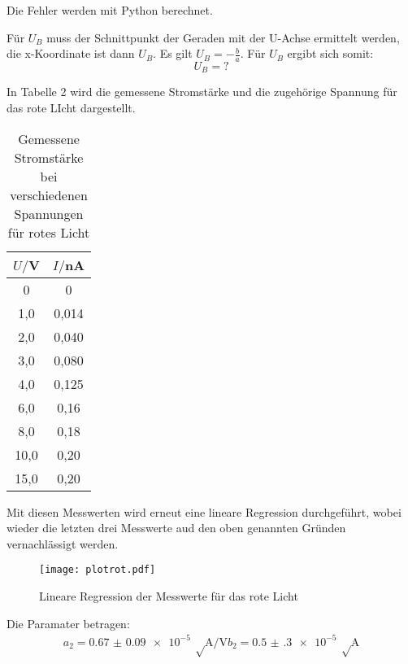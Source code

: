 Die Fehler werden mit Python berechnet.

Für $U_B$ muss der Schnittpunkt der Geraden mit der U-Achse ermittelt werden, die x-Koordinate ist dann $U_B$.
Es gilt $U_B = -\frac{b}{a}$. Für $U_B$ ergibt sich somit:
\begin{equation*}
  U_B = ?
\end{equation*}


In Tabelle 2 wird die gemessene Stromstärke und die zugehörige Spannung für das rote LIcht dargestellt.

\begin{table}[H]
  \centering
  \caption{Gemessene Stromstärke bei verschiedenen Spannungen für rotes Licht}
  \label{tab:Spannungsamplitude}
  \begin{tabular}{c c}
    \toprule
    $U/$V & $I/$nA \\
    \midrule
     0 & 0 \\
     1,0 & 0,014 \\
     2,0 & 0,040 \\
     3,0 & 0,080 \\
     4,0 & 0,125 \\
     6,0 & 0,16 \\
     8,0 & 0,18 \\
    10,0 & 0,20 \\
    15,0 & 0,20 \\
    \bottomrule
  \end{tabular}
\end{table}

Mit diesen Messwerten wird erneut eine lineare Regression durchgeführt, wobei wieder die letzten drei Messwerte
aud den oben genannten Gründen vernachlässigt werden.

\begin{figure}
  \centering
  \texttt{[image: plotrot.pdf]}
  \caption{Lineare Regression der Messwerte für das rote Licht}
  \label{fig:plot}
\end{figure}

Die Paramater betragen:
\begin{align*}
  a_2 = \SI{0.67(9)e-5}{\sqrt\ampere\per\volt}
  b_2 = \SI{0.5(3)e-5}{\sqrt\ampere}
\end{align*}
